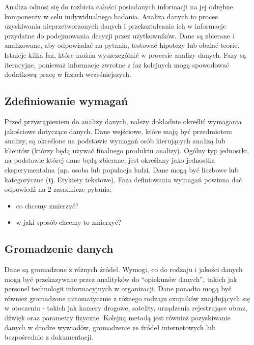 \documentclass[
  letterpaper,
  DIV=11,
  numbers=noendperiod]{scrreprt}
\providecommand{\tightlist}{%
  \setlength{\itemsep}{0pt}\setlength{\parskip}{0pt}}\usepackage{longtable,booktabs,array}
\begin{document}
Analiza odnosi się do rozbicia całości posiadanych informacji na jej
odrębne komponenty w celu indywidualnego badania. Analiza danych to
proces uzyskiwania nieprzetworzonych danych i przekształcania ich w
informacje przydatne do podejmowania decyzji przez użytkowników. Dane są
zbierane i analizowane, aby odpowiadać na pytania, testować hipotezy lub
obalać teorie. Istnieje kilka faz, które można wyszczególnić w procesie
analizy danych. Fazy są iteracyjne, ponieważ informacje zwrotne z faz
kolejnych mogą spowodować dodatkową pracę w fazach wcześniejszych.

\subsection{Zdefiniowanie wymagań}\label{zdefiniowanie-wymagaux144}

Przed przystąpieniem do analizy danych, należy dokładnie określić
wymagania jakościowe dotyczące danych. Dane wejściowe, które mają być
przedmiotem analizy, są określone na podstawie wymagań osób kierujących
analizą lub klientów (którzy będą używać finalnego produktu analizy).
Ogólny typ jednostki, na podstawie której dane będą zbierane, jest
określany jako jednostka eksperymentalna (np. osoba lub populacja ludzi.
Dane mogą być liczbowe lub kategoryczne (tj. Etykiety tekstowe). Faza
definiowania wymagań powinna dać odpowiedź na 2 zasadnicze pytania:

\begin{itemize}
\tightlist
\item
  co chcemy zmierzyć?
\item
  w jaki sposób chcemy to zmierzyć?
\end{itemize}

\subsection{Gromadzenie danych}\label{gromadzenie-danych}

Dane są gromadzone z różnych źródeł. Wymogi, co do rodzaju i jakości
danych mogą być przekazywane przez analityków do ``opiekunów danych'',
takich jak personel technologii informacyjnych w organizacji. Dane
ponadto mogą być również gromadzone automatycznie z różnego rodzaju
czujników znajdujących się w otoczeniu - takich jak kamery drogowe,
satelity, urządzenia rejestrujące obraz, dźwięk oraz parametry fizyczne.
Kolejną metodą jest również pozyskiwanie danych w drodze wywiadów,
gromadzenie ze źródeł internetowych lub bezpośrednio z dokumentacji.
\end{document}

